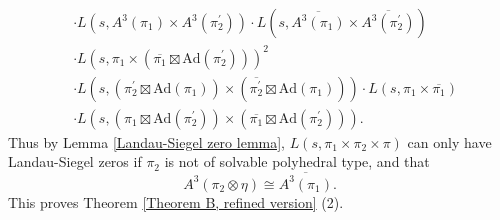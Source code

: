 \documentclass[12pt]{amsart}
\newcommand{\Ad}{\text{Ad}}
\newcommand{\ov}{\overline}
\begin{document}
\begin{enumerate}
\begin{enumerate}
\begin{align*}
            &\cdot L(s,A^3(\pi_1) \times A^3(\pi_2^\prime)) \cdot L(s,\ov{A^3(\pi_1)} \times \ov{A^3(\pi_2^\prime)}) \\
            &\cdot L(s,\pi_1 \times (\ov{\pi_1} \boxtimes \Ad(\pi_2^\prime)))^2 \\
            &\cdot L(s,(\pi_2^\prime \boxtimes \Ad(\pi_1)) \times (\ov{\pi_2^\prime} \boxtimes \Ad(\pi_1))) \cdot L(s,\pi_1 \times \ov{\pi_1}) \\
            &\cdot L(s,(\pi_1 \boxtimes \Ad(\pi_2^\prime)) \times (\ov{\pi_1} \boxtimes \Ad(\pi_2^\prime))).
        \end{align*}
        Thus by Lemma \ref{Landau-Siegel zero lemma}, $L(s,\pi_1 \times \pi_2 \times \pi)$ can only have Landau-Siegel zeros if $\pi_2$ is not of solvable polyhedral type, and that 
        $$A^3(\pi_2 \otimes \eta) \cong \ov{A^3(\pi_1)}.$$
        This proves Theorem \ref{Theorem B, refined version} (2).
    \end{enumerate}
\end{enumerate}
\end{document}
